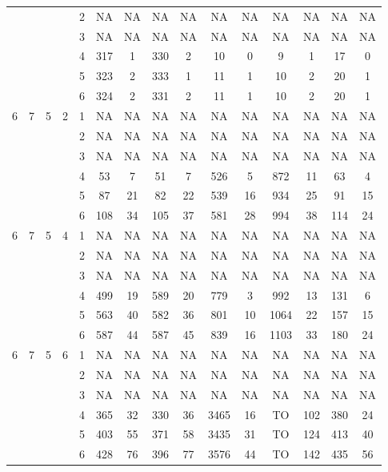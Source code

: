 \begin{longtable}{|c|c|c|c|c|c c|c c|c c|c c|c c|}
 & & & & 2 & NA & NA & NA & NA & NA & NA & NA & NA & NA & NA \\
 & & & & 3 & NA & NA & NA & NA & NA & NA & NA & NA & NA & NA \\
 & & & & 4 & 317 & 1 & 330 & 2 & 10 & 0 & 9 & 1 & 17 & 0 \\
 & & & & 5 & 323 & 2 & 333 & 1 & 11 & 1 & 10 & 2 & 20 & 1 \\
 & & & & 6 & 324 & 2 & 331 & 2 & 11 & 1 & 10 & 2 & 20 & 1 \\
\hline
\multirow{6}{*}{6} & \multirow{6}{*}{7} & \multirow{6}{*}{5} & \multirow{6}{*}{2} & 1 & NA & NA & NA & NA & NA & NA & NA & NA & NA & NA \\
 & & & & 2 & NA & NA & NA & NA & NA & NA & NA & NA & NA & NA \\
 & & & & 3 & NA & NA & NA & NA & NA & NA & NA & NA & NA & NA \\
 & & & & 4 & 53 & 7 & 51 & 7 & 526 & 5 & 872 & 11 & 63 & 4 \\
 & & & & 5 & 87 & 21 & 82 & 22 & 539 & 16 & 934 & 25 & 91 & 15 \\
 & & & & 6 & 108 & 34 & 105 & 37 & 581 & 28 & 994 & 38 & 114 & 24 \\
\hline
\multirow{6}{*}{6} & \multirow{6}{*}{7} & \multirow{6}{*}{5} & \multirow{6}{*}{4} & 1 & NA & NA & NA & NA & NA & NA & NA & NA & NA & NA \\
 & & & & 2 & NA & NA & NA & NA & NA & NA & NA & NA & NA & NA \\
 & & & & 3 & NA & NA & NA & NA & NA & NA & NA & NA & NA & NA \\
 & & & & 4 & 499 & 19 & 589 & 20 & 779 & 3 & 992 & 13 & 131 & 6 \\
 & & & & 5 & 563 & 40 & 582 & 36 & 801 & 10 & 1064 & 22 & 157 & 15 \\
 & & & & 6 & 587 & 44 & 587 & 45 & 839 & 16 & 1103 & 33 & 180 & 24 \\
\hline
\multirow{6}{*}{6} & \multirow{6}{*}{7} & \multirow{6}{*}{5} & \multirow{6}{*}{6} & 1 & NA & NA & NA & NA & NA & NA & NA & NA & NA & NA \\
 & & & & 2 & NA & NA & NA & NA & NA & NA & NA & NA & NA & NA \\
 & & & & 3 & NA & NA & NA & NA & NA & NA & NA & NA & NA & NA \\
 & & & & 4 & 365 & 32 & 330 & 36 & 3465 & 16 & TO & 102 & 380 & 24 \\
 & & & & 5 & 403 & 55 & 371 & 58 & 3435 & 31 & TO & 124 & 413 & 40 \\
 & & & & 6 & 428 & 76 & 396 & 77 & 3576 & 44 & TO & 142 & 435 & 56 \\

\end{longtable}
